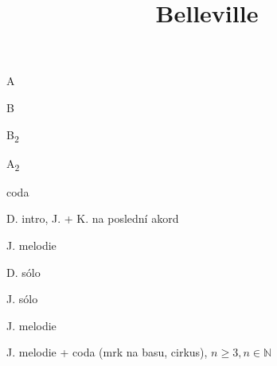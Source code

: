 \documentclass[timestamp]{jazzgrid}
\title{Belleville}
\begin{document}
\maketitle
\begin{musicsection}{A}
\barline
	{\barfour{}
		{}
		{}
		{}
		{}
	}
	{\barfour{}
		{}
		{}
		{}
		{}
	}
	{\barfour{}
		{}
		{}
		{}
		{}
	}
	{\barfour{}
		{}
		{}
		{}
		{}
	}
\barline
	{\barfour{}
		{}
		{}
		{}
		{}
	}
	{\barfour{}
		{}
		{}
		{}
		{}
	}
	{\barfour{}
		{}
		{}
		{}
		{}
	}
	{\barfour{}
		{}
		{}
		{}
		{}
	}
\end{musicsection}
\begin{musicsection}{B}
\barline
	{\barfour{}
		{}
		{}
		{}
		{}
	}
	{\barfour{}
		{}
		{}
		{}
		{}
	}
	{\barfour{}
		{}
		{}
		{}
		{}
	}
	{\barfour{}
		{}
		{}
		{}
		{}
	}
\barline
	{\barfour{}
		{}
		{}
		{}
		{}
	}
	{\barfour{}
		{}
		{}
		{}
		{}
	}
	{\barfour{}
		{}
		{}
		{}
		{}
	}
	{\barfour{}
		{}
		{}
		{}
		{}
	}
\end{musicsection}

\begin{musicsection}{B\textsubscript{2}}
\barline
	{\barfour{}
		{}
		{}
		{}
		{}
	}
	{\barfour{}
		{}
		{}
		{}
		{}
	}
	{\barfour{}
		{}
		{}
		{}
		{}
	}
	{\barfour{}
		{}
		{}
		{}
		{}
	}
\barline
	{\barfour{}
		{}
		{}
		{}
		{}
	}
	{\barfour{}
		{}
		{}
		{}
		{}
	}
	{\barfour{}
		{}
		{}
		{}
		{}
	}
	{\barfour{}
		{}
		{}
		{}
		{}
	}
\barline
	{\barfour{}
		{}
		{}
		{}
		{}
	}
	{\barfour{}
		{}
		{}
		{}
		{}
	}
	{\barfour{}
		{}
		{}
		{}
		{}
	}
	{\barfour{}
		{}
		{}
		{}
		{}
	}
\end{musicsection}
\begin{musicsection}{A\textsubscript{2}}
	{
		{}
		{}
		{}
		{}
	}
	{\barfour{}
		{}
		{}
		{}
		{}
	}
\end{musicsection}
\begin{musicsection}{coda}
	{\barfour{}
		{}
		{}
		{}
		{}
	}
	{\barfour{}
		{}
		{}
		{}
		{}
	}
\end{musicsection}

\footnotesize
\begin{description}[noitemsep,align=right,labelwidth=\widthof{\bfseries{$2\times$AABA}}]
	\item [A] D. intro, J. + K. na poslední akord
	\item [AABA] J. melodie
	\item [$2\times$AABA] D. sólo
	\item [$2\times$AABA] J. sólo
	\item [AABB\textsubscript{2}] J. melodie
	\item [{\phantom{AAB}$[$A\textsubscript{2}$]_n$}] J. melodie + coda (mrk na basu, cirkus), $n \geq 3, n \in \mathbb{N}$
\end{description}
\end{document}
